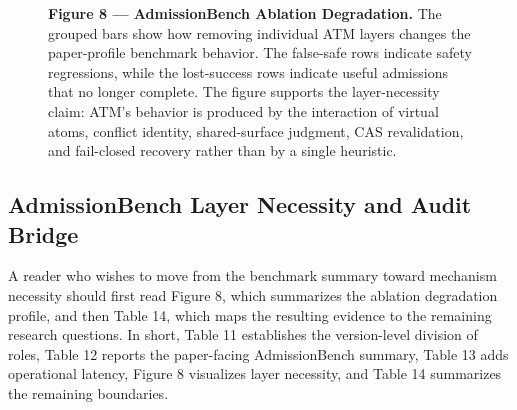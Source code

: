 \documentclass[9pt,letterpaper]{extarticle}
\begin{document}
\begin{figure}[!b]
{\small \noindent\textbf{Figure 8 --- AdmissionBench Ablation Degradation.} The grouped bars show how removing individual ATM layers changes the paper-profile benchmark behavior. The false-safe rows indicate safety regressions, while the lost-success rows indicate useful admissions that no longer complete. The figure supports the layer-necessity claim: ATM's behavior is produced by the interaction of virtual atoms, conflict identity, shared-surface judgment, CAS revalidation, and fail-closed recovery rather than by a single heuristic.\par}
\vspace{1pt}
\centering
{}
\end{figure}

\subsection{AdmissionBench Layer Necessity and Audit Bridge}

A reader who wishes to move from the benchmark summary toward mechanism necessity should first read Figure 8, which summarizes the ablation degradation profile, and then Table 14, which maps the resulting evidence to the remaining research questions. In short, Table 11 establishes the version-level division of roles, Table 12 reports the paper-facing AdmissionBench summary, Table 13 adds operational latency, Figure 8 visualizes layer necessity, and Table 14 summarizes the remaining boundaries.
\end{document}
